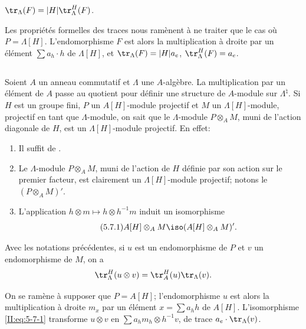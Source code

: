 \begin{proposition_}\label{II:5-6}
$\tr_\Lambda(F) = |H|\tr_\Lambda^H(F)$. 
\end{proposition_}

Les propriétés formelles des traces nous ramènent à ne traiter que le 
cas où $P=\Lambda[H]$. L'endomorphisme $F$ est alors la multiplication à 
droite par un élément $\sum a_h\cdot h$ de $\Lambda[H]$, et 
$\tr_\Lambda(F) = |H| a_e$, $\tr_\Lambda^H(F) = a_e$. 





\subsection{}\label{II:5-7}

Soient $A$ un anneau commutatif et $\Lambda$ une $A$-algèbre. La multiplication 
par un élément de $A$ passe au quotient pour définir une structure de 
$A$-module sur $\Lambda^\natural$. Si $H$ est un groupe fini, $P$ un $A[H]$-module 
projectif et $M$ un $\Lambda[H]$-module, projectif en tant que $\Lambda$-module, 
on sait que le $\Lambda$-module $P\otimes_A M$, muni de l'action diagonale de 
$H$, est un $\Lambda[H]$-module projectif. En effet: 
\begin{enumerate}[\indent a)]
  \item Il suffit de . 
  \item Le $\Lambda$-module $P\otimes_A M$, muni de l'action de $H$ définie 
    par son action sur le premier facteur, est clairement un 
    $\Lambda[H]$-module projectif; notons le $(P\otimes_A M)'$. 
  \item L'application $h\otimes m\mapsto h\otimes h^{-1} m$ induit un 
    isomorphisme 
    \begin{equation*}\tag{5.7.1}\label{II:eq:5-7-1}
      A[H]\otimes_A M \iso (A[H]\otimes_A M)' \text{.}
    \end{equation*}
\end{enumerate}





\begin{proposition_}\label{II:5-8}
Avec les notations précédentes, si $u$ est un endomorphisme de $P$ et 
$v$ un endomorphisme de $M$, on a 
\[
  \tr_\Lambda^H(u\otimes v) = \tr_A^H(u)\tr_\Lambda(v) \text{.}
\]
\end{proposition_}

On se ramène à supposer que $P=A[H]$; l'endomorphisme $u$ est alors la 
multiplication à droite $m_x$ par un élément $x=\sum a_h h$ de $A[H]$. 
L'isomorphisme \eqref{II:eq:5-7-1} transforme $u\otimes v$ en 
$\sum a_h m_h\otimes h^{-1} v$, de trace $a_e\cdot\tr_\Lambda(v)$. 





